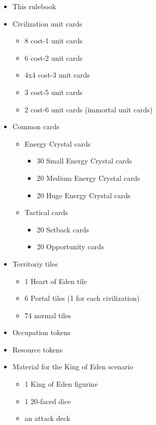 \documentclass[a4paper]{article}
\begin{document}
    \begin{itemize}
        \item This rulebook
        \item Civilization unit cards
            \begin{itemize}
                \item 8 cost-1 unit cards
                \item 6 cost-2 unit cards
                \item 4x4 cost-3 unit cards
                \item 3 cost-5 unit cards
                \item 2 cost-6 unit cards (immortal unit cards)
            \end{itemize}
        \item Common cards
            \begin{itemize}
                \item Energy Crystal cards
                    \begin{itemize}
                        \item 30 Small Energy Crystal cards
                        \item 20 Medium Energy Crystal cards
                        \item 20 Huge Energy Crystal cards
                    \end{itemize}
                \item Tactical cards
                    \begin{itemize}
                        \item 20 Setback cards
                        \item 20 Opportunity cards
                    \end{itemize}
            \end{itemize}
        \item Territoriy tiles
            \begin{itemize}
                \item 1 Heart of Eden tile
                \item 6 Portal tiles (1 for each civilization)
                \item 74 normal tiles
            \end{itemize}
        \item Occupation tokens
        \item Resource tokens
        \item Material for the King of Eden scenario
            \begin{itemize}
                \item 1 King of Eden figurine
                \item 1 20-faced dice
                \item an attack deck
            \end{itemize}
    \end{itemize}
\end{document}
